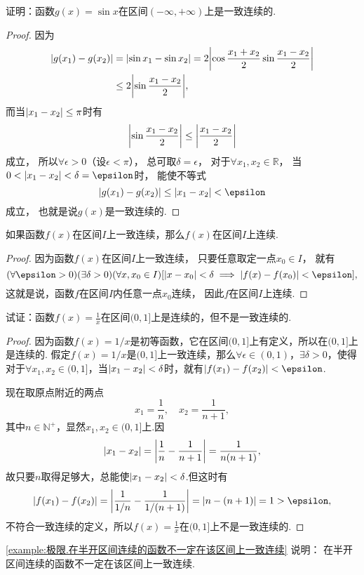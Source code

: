 \begin{example}
证明：函数\(g(x)=\sin x\)在区间\((-\infty,+\infty)\)上是一致连续的.
\begin{proof}
因为
\begin{align*}
\abs{g(x_1)-g(x_2)}
&= \abs{\sin x_1 - \sin x_2}
= 2\abs{\cos\frac{x_1+x_2}{2} \sin\frac{x_1-x_2}{2}} \\
&\leq 2\abs{\sin\frac{x_1-x_2}{2}},
\end{align*}
而当\(\abs{x_1-x_2} \leq \pi\)时有\[
\abs{\sin\frac{x_1-x_2}{2}} \leq \abs{\frac{x_1-x_2}{2}}
\]成立，
所以\(\forall\epsilon>0\)（设\(\epsilon<\pi\)），
总可取\(\delta=\epsilon\)，
对于\(\forall x_1,x_2\in\mathbb{R}\)，
当\(0<\abs{x_1-x_2}<\delta=\epsilon\)时，
能使不等式\[
\abs{g(x_1)-g(x_2)} \leq \abs{x_1-x_2} < \epsilon
\]成立，
也就是说\(g(x)\)是一致连续的.
\end{proof}
\end{example}

\begin{theorem}\label{theorem:极限.闭区间上连续函数的性质.一致连续函数一定连续}
如果函数\(f(x)\)在区间\(I\)上一致连续，那么\(f(x)\)在区间\(I\)上连续.
\begin{proof}
因为函数\(f(x)\)在区间\(I\)上一致连续，
只要任意取定一点\(x_0 \in I\)，
就有\[
	(\forall \epsilon > 0)
	(\exists \delta > 0)
	(\forall x,x_0 \in I)
	[
		\abs{x-x_0} < \delta
		\implies
		\abs{f(x)-f(x_0)} < \epsilon
	],
\]
这就是说，函数\(f\)在区间\(I\)内任意一点\(x_0\)连续，
因此\(f\)在区间\(I\)上连续.
\end{proof}
\end{theorem}

\begin{example}\label{example:极限.在半开区间连续的函数不一定在该区间上一致连续}
试证：函数\(f(x) = \frac{1}{x}\)在区间\((0,1]\)上是连续的，但不是一致连续的.
\begin{proof}
因为函数\(f(x) = 1/x\)是初等函数，它在区间\((0,1]\)上有定义，所以在\((0,1]\)上是连续的.
假定\(f(x) = 1/x\)是\((0,1]\)上一致连续，那么\(\forall \epsilon \in (0,1)\)，\(\exists \delta > 0\)，使得对于\(\forall x_1,x_2 \in (0,1]\)，当\(\abs{x_1 - x_2} < \delta\)时，就有\(\abs{f(x_1) - f(x_2)} < \epsilon\).

现在取原点附近的两点\[
x_1 = \frac{1}{n}, \quad x_2 = \frac{1}{n+1},
\]其中\(n\in\mathbb{N}^+\)，显然\(x_1,x_2 \in (0,1]\)上.因\[
\abs{x_1 - x_2} = \abs{\frac{1}{n} - \frac{1}{n+1}}
= \frac{1}{n(n+1)},
\]故只要\(n\)取得足够大，总能使\(\abs{x_1 - x_2} < \delta\).但这时有\[
\abs{f(x_1) - f(x_2)}
= \abs{\frac{1}{1/n} - \frac{1}{1/(n+1)}}
= \abs{n - (n+1)}
= 1 > \epsilon,
\]不符合一致连续的定义，所以\(f(x) = \frac{1}{x}\)在\((0,1]\)上不是一致连续的.
\end{proof}
\end{example}
\cref{example:极限.在半开区间连续的函数不一定在该区间上一致连续} 说明：
在半开区间连续的函数不一定在该区间上一致连续.


